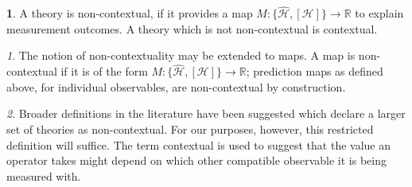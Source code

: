 \documentclass[british,aps,prl,superscriptaddress,nofootinbib,times,reprint]{revtex4-1}
\theoremstyle{plain}
\theoremstyle{plain}
\theoremstyle{definition}
\newtheorem{defn}{\protect\definitionname}
\theoremstyle{remark}
\theoremstyle{remark}
\newtheorem{defnrem}{\protect\remarkname}[defn]
\theoremstyle{remark}
\theoremstyle{plain}
\theoremstyle{plain}
\theoremstyle{plain}
\theoremstyle{definition}
\theoremstyle{definition}
\providecommand{\definitionname}{Definition}
\providecommand{\remarkname}{Remark}
\begin{document}
\begin{defn} A theory is non-contextual, if it
provides a map $M: \{
\hat{\mathcal{H}},[\mathcal{H}] \} \to\mathbb{R}$
to explain measurement outcomes. A theory which is
not non-contextual is contextual. \cite{peresBook}
\end{defn}


\begin{defnrem} The notion of non-contextuality may be
extended to maps. A map is non-contextual if it is
of the form $M: \{ \hat{\mathcal{H}},[\mathcal{H}]
\} \to\mathbb{R}$; prediction maps as defined above, for individual observables, are non-contextual by construction.  
\end{defnrem}
\begin{defnrem}
Broader definitions in the literature have been
suggested which declare a larger set of theories
as non-contextual. For our purposes, however, this
restricted definition will suffice. The term
contextual is used to suggest that the value an
operator takes might depend on which other
compatible observable it is being  measured with.
\end{defnrem}
\end{document}
